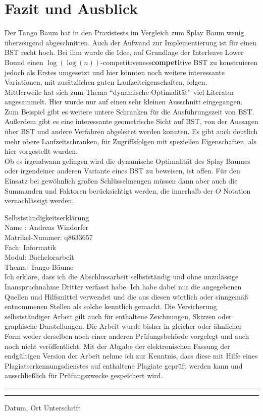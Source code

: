 \documentclass[a4paper,12pt]{article}
\begin{document}
\section{Fazit und Ausblick}
Der Tango Baum hat in den Praxistests im Vergleich zum Splay Baum wenig überzeugend abgeschnitten. Auch der Aufwand zur Implementierung ist für einen BST recht hoch. Bei ihm wurde die Idee, auf Grundlage der Interleave Lower Bound einen $\log\left(\log\left(n\right)\right)$-competitiveness\textbf{competi}tive BST zu konstruieren jedoch als Erstes umgesetzt und hier könnten noch weitere interessante Variationen, mit zusätzlichen guten Laufzeiteigenschaften, folgen. \\
Mittlerweile hat sich zum Thema \enquote{dynamische Optimalität} viel Literatur angesammelt. Hier wurde nur auf einen sehr kleinen Ausschnitt eingegangen. Zum Beispiel gibt es  weitere untere Schranken für die Ausführungszeit von BST. Außerdem gibt es eine interessante geometrische Sicht auf BST, von der Aussagen über BST und andere Verfahren abgeleitet werden konnten. Es gibt auch deutlich mehr obere Laufzeitschranken, für Zugriffsfolgen mit speziellen Eigenschaften, als  hier vorgestellt wurden. \\
Ob es irgendwann gelingen wird die dynamische Optimalität des Splay Baumes oder irgendeiner anderen Variante eines BST zu beweisen, ist offen. Für den Einsatz bei gewöhnlich großen Schlüsselmengen müssen dann aber auch die Summanden und Faktoren berücksichtigt werden, die innerhalb der $O$ Notation vernachlässigt werden.


\newpage
\listoffigures
\newpage
\Large
\noindent Selbstständigkeitserklärung\bigskip\\
\normalsize
\noindent Name : Andreas Windorfer\\
Matrikel-Nummer: q8633657\\
Fach: Informatik\\
Modul: Bachelorarbeit\\
Thema: Tango Bäume \bigskip\\


\noindent Ich erkläre, dass ich die Abschlussarbeit selbstständig und ohne unzulässige Inanspruchnahme Dritter verfasst habe. Ich habe dabei nur die angegebenen Quellen und Hilfsmittel verwendet und die aus diesen wörtlich oder sinngemäß entnommenen Stellen als solche kenntlich gemacht. Die Versicherung selbstständiger Arbeit gilt auch für enthaltene Zeichnungen, Skizzen oder graphische Darstellungen. Die Arbeit wurde bisher in gleicher oder ähnlicher Form weder derselben noch einer anderen Prüfungsbehörde vorgelegt und auch noch nicht veröffentlicht. Mit der Abgabe der elektronischen Fassung der endgültigen Version der Arbeit nehme ich zur Kenntnis, dass diese mit Hilfe eines Plagiatserkennungsdienstes auf enthaltene Plagiate geprüft werden kann und ausschließlich für Prüfungszwecke gespeichert wird.\\

\vspace{50pt}
\noindent\rule{5cm}{.4pt}\hfill\rule{5cm}{.4pt}\par
\noindent Datum, Ort \hfill Unterschrift
                       



\newpage


\end{document}
